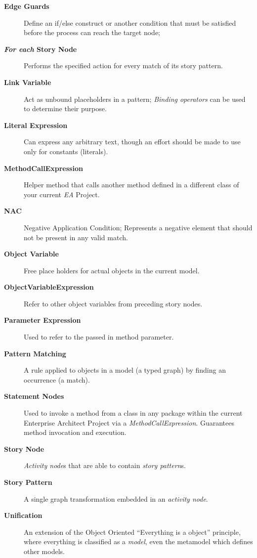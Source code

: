 \begin{description}
\item[\bf Edge Guards]
Define an if/else construct or another condition that must be satisfied before the process can reach the target node;

\item[\bf \emph{For each} Story Node]
Performs the specified action for every match of its story pattern.

\item[\bf Link Variable]
Act as unbound placeholders in a pattern; \emph{Binding operators} can be used to determine their purpose.

\item[\bf Literal Expression]
Can express any arbitrary text, though an effort should be made to use only for constants (literals).

\item[\bf MethodCallExpression]
Helper method that calls another method defined in a different class of your current \emph{EA} Project.

\item[\bf NAC]
Negative Application Condition; Represents a negative element that should not be present in any valid match.

\item[\bf Object Variable]
Free place holders for actual objects in the current model.

\item[\bf ObjectVariableExpression]
Refer to other object variables from preceding story nodes.

\item[\bf Parameter Expression]
Used to refer to the passed in method parameter.

\item[\bf Pattern Matching]
A rule applied to objects in a model (a typed graph) by finding an occurrence (a match). 

\item[\bf Statement Nodes]
Used to invoke a method from a class in any package within the current Enterprise Architect Project via a \emph{MethodCallExpression}. Guarantees method
invocation and execution.

\item[\bf Story Node]
\emph{Activity node}s that are able to contain \emph{story pattern}s.

\item[\bf Story Pattern]
A single graph transformation embedded in an \emph{activity node}.

\item[\bf Unification]
An extension of the Object Oriented ``Everything is a object'' principle, where everything is classified as a \emph{model}, even the metamodel which defines
other models.
\end{description}